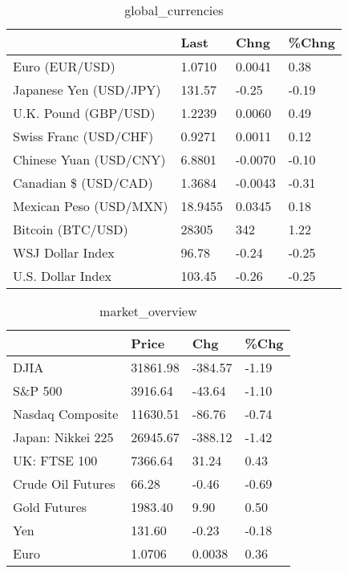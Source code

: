 \documentclass{article}%
\begin{document}
%


\begin{table}[htbp]%
\caption{global\_currencies}%
\centering%
\begin{adjustbox}{width=1\textwidth}%
\begin{tabular}{llll}
\toprule
                       &    Last &    Chng & \%Chng \\
\midrule
        Euro (EUR/USD) &  1.0710 &  0.0041 &  0.38 \\
Japanese Yen (USD/JPY) &  131.57 &   -0.25 & -0.19 \\
  U.K. Pound (GBP/USD) &  1.2239 &  0.0060 &  0.49 \\
 Swiss Franc (USD/CHF) &  0.9271 &  0.0011 &  0.12 \\
Chinese Yuan (USD/CNY) &  6.8801 & -0.0070 & -0.10 \\
  Canadian \$ (USD/CAD) &  1.3684 & -0.0043 & -0.31 \\
Mexican Peso (USD/MXN) & 18.9455 &  0.0345 &  0.18 \\
     Bitcoin (BTC/USD) &   28305 &     342 &  1.22 \\
      WSJ Dollar Index &   96.78 &   -0.24 & -0.25 \\
     U.S. Dollar Index &  103.45 &   -0.26 & -0.25 \\
\bottomrule
\end{tabular}
%
\end{adjustbox}%
\end{table}

%


\begin{table}[htbp]%
\caption{market\_overview}%
\centering%
\begin{adjustbox}{width=1\textwidth}%
\begin{tabular}{llll}
\toprule
                  &    Price &     Chg &  \%Chg \\
\midrule
             DJIA & 31861.98 & -384.57 & -1.19 \\
          S\&P 500 &  3916.64 &  -43.64 & -1.10 \\
 Nasdaq Composite & 11630.51 &  -86.76 & -0.74 \\
Japan: Nikkei 225 & 26945.67 & -388.12 & -1.42 \\
     UK: FTSE 100 &  7366.64 &   31.24 &  0.43 \\
Crude Oil Futures &    66.28 &   -0.46 & -0.69 \\
     Gold Futures &  1983.40 &    9.90 &  0.50 \\
              Yen &   131.60 &   -0.23 & -0.18 \\
             Euro &   1.0706 &  0.0038 &  0.36 \\
\bottomrule
\end{tabular}
%
\end{adjustbox}%
\end{table}

%
\end{document}

